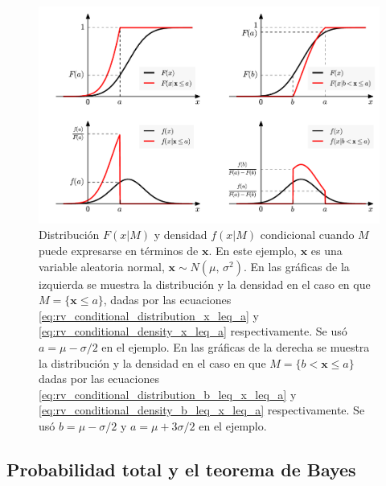 \documentclass[a4paper]{report}
\newcommand{\x}{\mathbf{x}}
\begin{document}
\begin{figure}[!htb]
\begin{center}
\includegraphics[width=1\columnwidth]{figuras/conditional_distribition_and_density.pdf}
\caption{\label{fig:conditional_distribition_and_density} Distribución \(F(x|M)\) y densidad \(f(x|M)\) condicional cuando \(M\) puede expresarse en términos de \(\x\). En este ejemplo, \(\x\) es una variable aleatoria normal, \(\x\sim N(\mu,\,\sigma^2)\). En las gráficas de la izquierda se muestra la distribución y la densidad en el caso en que \(M=\{\x\leq a\}\), dadas por las ecuaciones \ref{eq:rv_conditional_distribution_x_leq_a} y \ref{eq:rv_conditional_density_x_leq_a} respectivamente. Se usó \(a=\mu-\sigma/2\) en el ejemplo. En las gráficas de la derecha se muestra la distribución y la densidad en el caso en que \(M=\{b< \x\leq a\}\) dadas por las ecuaciones \ref{eq:rv_conditional_distribution_b_leq_x_leq_a} y \ref{eq:rv_conditional_density_b_leq_x_leq_a} respectivamente. Se usó \(b=\mu-\sigma/2\) y \(a=\mu+3\sigma/2\) en el ejemplo.}
\end{center}
\end{figure}

\subsection{Probabilidad total y el teorema de Bayes}
\end{document}
